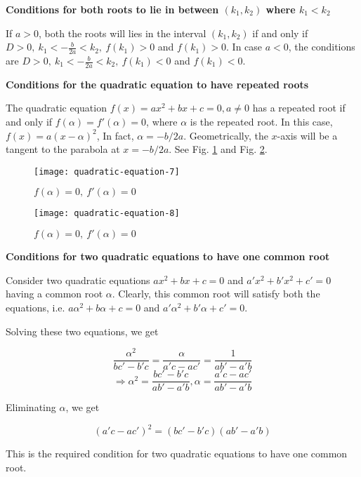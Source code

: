 \noindent\textbf{Conditions for both roots to lie in between $(k_1, k_2)$ where $k_1<k_2$}

If $a >0$, both the roots will lies in the interval $(k_1, k_2)$ if and only if $D>0,~k_1<-\frac{b}{2a}<k_2,~f(k_1)>0$ and
$f(k_1)>0$. In case $a<0$, the conditions are $D>0,~k_1<-\frac{b}{2a}<k_2,~f(k_1)<0$ and $f(k_1)<0$.

\noindent\textbf{Conditions for the quadratic equation to have repeated roots}

The quadratic equation $f(x) = ax^2 + bx + c = 0, a\neq 0$ has a repeated root if and only if $f(\alpha) = f'(\alpha) = 0$, where
$\alpha$ is the repeated root. In this case, $f(x) = a(x - \alpha)^2$, In fact, $\alpha = -b/2a$. Geometrically, the $x$-axis will
be a tangent to the parabola at $x = -b/2a$. See Fig. \ref{fig:7} and Fig. \ref{fig:8}.

\begin{figure}[H]
  \begin{center}
    \texttt{[image: quadratic-equation-7]}
    \caption{$f(\alpha)=0,~f'(\alpha)=0$}
    \label{fig:7}
  \end{center}
\end{figure}

\begin{figure}[H]
  \begin{center}
    \texttt{[image: quadratic-equation-8]}
    \caption{$f(\alpha)=0,~f'(\alpha)=0$}
    \label{fig:8}
  \end{center}
\end{figure}

\noindent\textbf{Conditions for two quadratic equations to have one common root}

Consider two quadratic equations $ax^2 + bx + c = 0$ and $a'x^2 + b'x^2 + c' = 0$ having a common root $\alpha$. Clearly, this
common root will satisfy both the equations, i.e. $a\alpha^2 + b\alpha + c = 0$ and $a'\alpha^2 + b'\alpha + c' = 0$.

Solving these two equations, we get

$$\frac{\alpha^2}{bc' - b'c} = \frac{\alpha}{a'c - ac'} = \frac{1}{ab' - a'b}$$
$$\Rightarrow \alpha^2 = \frac{bc' - b'c}{ab' - a'b}, \alpha = \frac{a'c - ac'}{ab' - a'b}$$

Eliminating $\alpha$, we get

$$(a'c - ac')^2 = (bc' - b'c)(ab' - a'b)$$

This is the required condition for two quadratic equations to have one common root.

